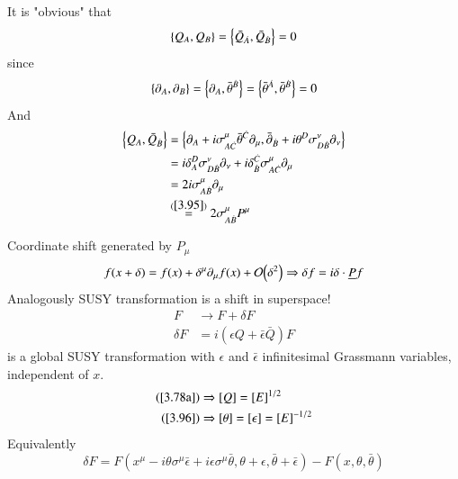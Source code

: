 It is "obvious" that
\begin{equation*}
   \acomm{Q_A}{Q_B} = \acomm{\bar{Q}_{\dot{A}}}{\bar{Q}_{\dot{B}}} = 0
\end{equation*}
since
\begin{equation*}
   \acomm{\partial_A}{\partial_B} = \acomm{\partial_A}{\bar{\theta}^{\dot{B}}} = \acomm{\bar{\theta}^{\dot{A}}}{\bar{\theta}^{\dot{B}}} = 0
\end{equation*}
And
\begin{align*}
   \acomm{Q_A}{\bar{Q}_{\dot{B}}} &= \acomm{\partial_A + i\sigma^\mu_{A\dot{C}}\bar{\theta}^{\dot{C}}\partial_\mu}{\bar\partial_{\dot{B}} + i \theta^D \sigma^\nu_{D\dot{B}}\partial_\nu} \\
                                  &= i \delta^D_A \sigma^\nu_{D\dot{B}} \partial_\nu + i\delta^{\dot{C}}_{\dot{B}} \sigma^\mu_{A\dot{C}}\partial_\mu \\
                                  &= 2 i \sigma^\mu_{A\dot{B}} \partial_\mu  \\
                                  &\stackrel{(\ref{3.95})}{=} 2 \sigma^\mu_{A\dot{B}} P^\mu
\end{align*}

Coordinate shift generated by $P_\mu$
\begin{equation*}
   f(x+\delta) = f(x) + \delta^\mu \partial_\mu f(x) + \order{\delta^2} \Rightarrow \delta f = i \delta \cdot \underline{P} f
\end{equation*}
Analogously SUSY transformation is a shift in superspace!
\begin{subequations}
   \label{3.97}
  \begin{align}
     F &\rightarrow F + \delta F \label{3.97a} \\
     \delta F &= i (\epsilon Q + \bar{\epsilon} \bar{Q}) F \label{3.97b}
  \end{align} 
\end{subequations}
is a global SUSY transformation with $\epsilon$ and $\bar{\epsilon}$ infinitesimal Grassmann variables, independent of $x$.
\begin{subequations}
   \label{3.98}
  \begin{align}
     (\ref{3.78a}) &\Rightarrow [Q] = [E]^{1/2} \label{3.98a} \\
     (\ref{3.96}) &\Rightarrow [\theta] = [\epsilon] = [E]^{-1/2} \label{3.98b}
  \end{align} 
\end{subequations}
Equivalently
\begin{equation}
   \delta F = F(x^\mu - i \theta \sigma^{\mu}\bar \epsilon + i \epsilon \sigma^\mu \bar\theta, \theta + \epsilon, \bar\theta + \bar\epsilon) - F(x, \theta, \bar\theta) \label{3.99}
\end{equation}

